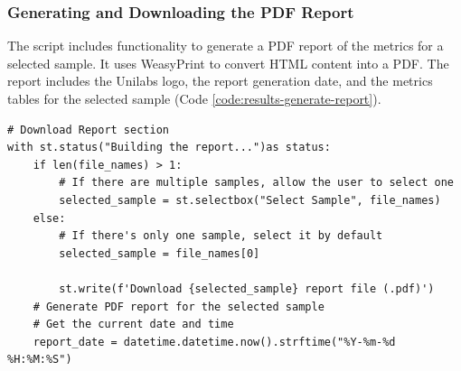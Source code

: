 \subsubsection{\textbf{Generating and Downloading the PDF Report}}

The script includes functionality to generate a PDF report of the metrics for a selected sample. It uses WeasyPrint to convert HTML content into a PDF. The report includes the Unilabs logo, the report generation date, and the metrics tables for the selected sample (Code \ref{code:results-generate-report}).

\begin{longlisting}
\begin{verbatim}
# Download Report section
with st.status("Building the report...")as status:
    if len(file_names) > 1:
        # If there are multiple samples, allow the user to select one
        selected_sample = st.selectbox("Select Sample", file_names)
    else:
        # If there's only one sample, select it by default
        selected_sample = file_names[0]
        
        st.write(f'Download {selected_sample} report file (.pdf)')
    # Generate PDF report for the selected sample
    # Get the current date and time
    report_date = datetime.datetime.now().strftime("%Y-%m-%d %H:%M:%S")
    

\end{verbatim}
\end{longlisting}

